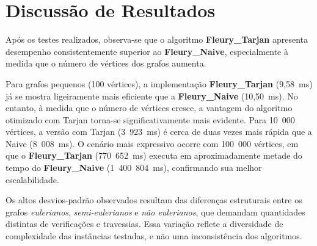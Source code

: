 \documentclass[12pt]{article}
\begin{document}
\section{Discussão de Resultados}

Após os testes realizados, observa-se que o algoritmo \textbf{Fleury\_Tarjan} apresenta desempenho consistentemente superior ao \textbf{Fleury\_Naive}, especialmente à medida que o número de vértices dos grafos aumenta.

Para grafos pequenos (100 vértices), a implementação \textbf{Fleury\_Tarjan} (9,58~ms) já se mostra ligeiramente mais eficiente que a \textbf{Fleury\_Naive} (10,50~ms). No entanto, à medida que o número de vértices cresce, a vantagem do algoritmo otimizado com Tarjan torna-se significativamente mais evidente. Para 10~000 vértices, a versão com Tarjan (3~923~ms) é cerca de duas vezes mais rápida que a Naive (8~008~ms). O cenário mais expressivo ocorre com 100~000 vértices, em que o \textbf{Fleury\_Tarjan} (770~652~ms) executa em aproximadamente metade do tempo do \textbf{Fleury\_Naive} (1~400~804~ms), confirmando sua melhor escalabilidade.

Os altos desvios-padrão observados resultam das diferenças estruturais entre os grafos \textit{eulerianos}, \textit{semi-eulerianos} e \textit{não eulerianos}, que demandam quantidades distintas de verificações e travessias. Essa variação reflete a diversidade de complexidade das instâncias testadas, e não uma inconsistência dos algoritmos.





\end{document}
